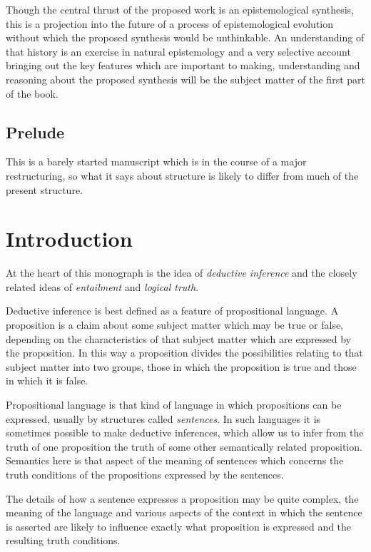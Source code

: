 \documentclass[10pt,titlepage]{book}
\begin{document}
Though the central thrust of the proposed work is an epistemological synthesis, this is a projection into the future of a process of epistemological evolution without which the proposed synthesis would be unthinkable.  An understanding of that history is an exercise in natural epistemology and a very selective account bringing out the key features which are important to making, understanding and reasoning about the proposed synthesis will be the subject matter of the first part of the book.

\section*{Prelude}

This is a barely started manuscript which is in the course of a major restructuring, so what it says about structure is likely to differ from much of the present structure.

\chapter{Introduction}

At the heart of this monograph is the idea of \emph{deductive inference} and the closely related ideas of \emph{entailment} and \emph{logical truth}.

Deductive inference is best defined as a feature of propositional language.
A proposition is a claim about some subject matter which may be true or false, depending on the characteristics of that subject matter which are expressed by the proposition.
In this way a proposition divides the possibilities relating to that subject matter into two groups, those in which the proposition is true and those in which it is false.

Propositional language is that kind of language in which propositions can be expressed, usually by structures called \emph{sentences}.
In such languages it is sometimes possible to make deductive inferences, which allow us to infer from the truth of one proposition the truth of some other semantically related proposition.
Semantics here is that aspect of the meaning of sentences which concerns the truth conditions of the propositions expressed by the sentences.

The details of how a sentence expresses a proposition may be quite complex, the meaning of the language and various aspects of the context in which the sentence is asserted are likely to influence exactly what proposition is expressed and the resulting truth conditions.
\end{document}
